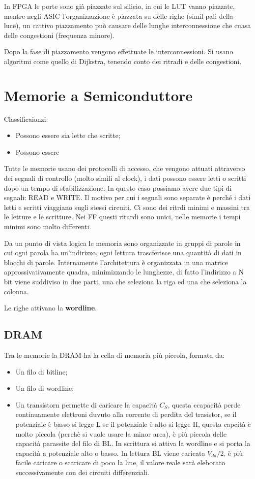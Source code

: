 \documentclass[12pt]{article}
\begin{document}
In FPGA le porte sono gi\`a piazzate sul silicio, in cui le LUT vanno piazzate, mentre negli ASIC l'organizzazione \`e piazzata su delle righe (simil pali della luce), un cattivo piazzamento pu\`o causare delle lunghe interconnessione che cuasa delle congestioni (frequenza minore).

Dopo la fase di piazzamento vengono effettuate le interconnessioni. Si usano algoritmi come quello di Dijkstra, tenendo conto dei ritradi e delle congestioni.


\newpage
\section{Memorie a Semiconduttore}
Classificaionzi:
\begin{itemize}
    \item Possono essere sia lette che scritte;
    \item Possono essere 
\end{itemize}

Tutte le memorie usano dei protocolli di accesso, che vengono attuati attraverso dei segnali di controllo (molto simili al clock), i dati possono essere letti o scritti dopo un tempo di stabilizzazione. In questo caso possiamo avere due tipi di segnali: READ e WRITE. Il motivo per cui i segnali sono separate \`e perch\'e i dati letti e scritti viaggiano sugli stessi circuiti. Ci sono dei ritrdi minimi e massini tra le letture e le scritture. Nei FF questi ritardi sono unici, nelle memorie i tempi minimi sono molto differenti.

Da un punto di vista logica le memoria sono organizzate in gruppi di parole in cui ogni parola ha un'indirizzo, ogni lettura trascferisce una quantit\`a di dati in blocchi di parole. Internamente l'architettura \`e organizzata in una matrice approssivativamente quadra, minimizzando le lunghezze, di fatto l'indirizzo a N bit viene suddiviso in due parti, una che seleziona la riga ed una che seleziona la colonna.

Le righe attivano la \textbf{wordline}.

\subsection{DRAM}
Tra le memorie la DRAM ha la cella di memoria pi\`u piccola, formata da:
\begin{itemize}
    \item Un filo di bitline;
    \item Un filo di wordline;
    \item Un transistorn permette di caricare la capacit\`a $C_S$, questa ccapacit\`a perde continuamente elettroni duvuto alla corrente di perdita del trasistor, se il potenziale \`e basso si legge L se il potenziale \`e alto si legge H, questa capcit\`a \`e molto piccola (perch\`e si vuole usare la minor area), \`e pi\`u piccola delle capacit\`a parassite del filo di BL. In scrittura si attiva la wordline e si porta la capacit\`a a potenziale alto o basso. In lettura BL viene caricata $V_{dd}/2$, \`e pi\`u facile caricare o scaricare di poco la line, il valore reale sar\`a eleborato successivamente con dei circuiti differenziali.
\end{itemize}
\end{document}
